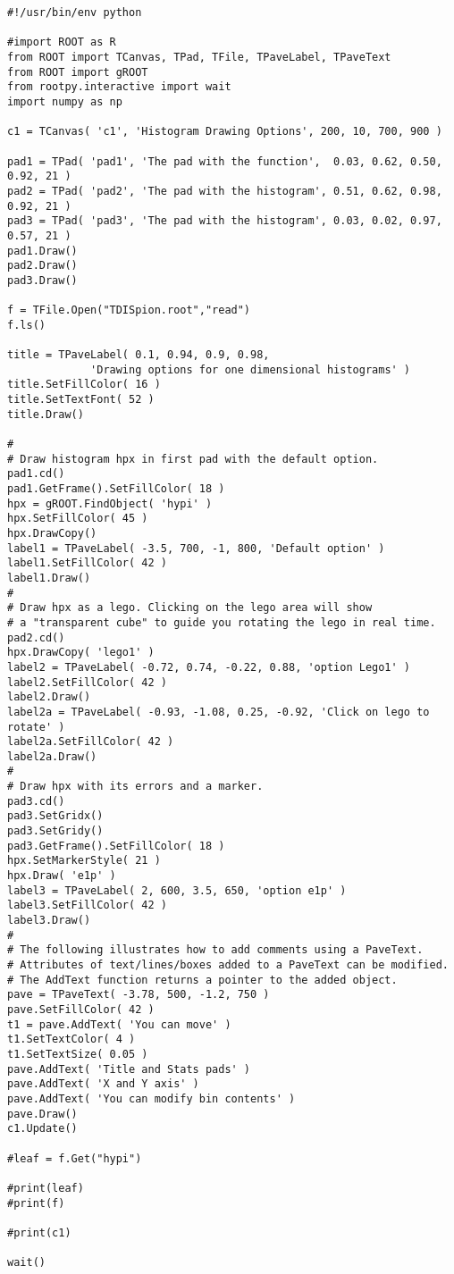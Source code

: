 \documentclass[11pt]{article}
\begin{document}
\begin{verbatim}
#!/usr/bin/env python

#import ROOT as R
from ROOT import TCanvas, TPad, TFile, TPaveLabel, TPaveText
from ROOT import gROOT
from rootpy.interactive import wait
import numpy as np

c1 = TCanvas( 'c1', 'Histogram Drawing Options', 200, 10, 700, 900 )

pad1 = TPad( 'pad1', 'The pad with the function',  0.03, 0.62, 0.50, 0.92, 21 )
pad2 = TPad( 'pad2', 'The pad with the histogram', 0.51, 0.62, 0.98, 0.92, 21 )
pad3 = TPad( 'pad3', 'The pad with the histogram', 0.03, 0.02, 0.97, 0.57, 21 )
pad1.Draw()
pad2.Draw()
pad3.Draw()

f = TFile.Open("TDISpion.root","read")
f.ls()

title = TPaveLabel( 0.1, 0.94, 0.9, 0.98,
		     'Drawing options for one dimensional histograms' )
title.SetFillColor( 16 )
title.SetTextFont( 52 )
title.Draw()

#
# Draw histogram hpx in first pad with the default option.
pad1.cd()
pad1.GetFrame().SetFillColor( 18 )
hpx = gROOT.FindObject( 'hypi' )
hpx.SetFillColor( 45 )
hpx.DrawCopy()
label1 = TPaveLabel( -3.5, 700, -1, 800, 'Default option' )
label1.SetFillColor( 42 )
label1.Draw()
#
# Draw hpx as a lego. Clicking on the lego area will show
# a "transparent cube" to guide you rotating the lego in real time.
pad2.cd()
hpx.DrawCopy( 'lego1' )
label2 = TPaveLabel( -0.72, 0.74, -0.22, 0.88, 'option Lego1' )
label2.SetFillColor( 42 )
label2.Draw()
label2a = TPaveLabel( -0.93, -1.08, 0.25, -0.92, 'Click on lego to rotate' )
label2a.SetFillColor( 42 )
label2a.Draw()
#
# Draw hpx with its errors and a marker.
pad3.cd()
pad3.SetGridx()
pad3.SetGridy()
pad3.GetFrame().SetFillColor( 18 )
hpx.SetMarkerStyle( 21 )
hpx.Draw( 'e1p' )
label3 = TPaveLabel( 2, 600, 3.5, 650, 'option e1p' )
label3.SetFillColor( 42 )
label3.Draw()
#
# The following illustrates how to add comments using a PaveText.
# Attributes of text/lines/boxes added to a PaveText can be modified.
# The AddText function returns a pointer to the added object.
pave = TPaveText( -3.78, 500, -1.2, 750 )
pave.SetFillColor( 42 )
t1 = pave.AddText( 'You can move' )
t1.SetTextColor( 4 )
t1.SetTextSize( 0.05 )
pave.AddText( 'Title and Stats pads' )
pave.AddText( 'X and Y axis' )
pave.AddText( 'You can modify bin contents' )
pave.Draw()
c1.Update()

#leaf = f.Get("hypi")

#print(leaf)
#print(f)

#print(c1)

wait()

\end{verbatim}
\end{document}
